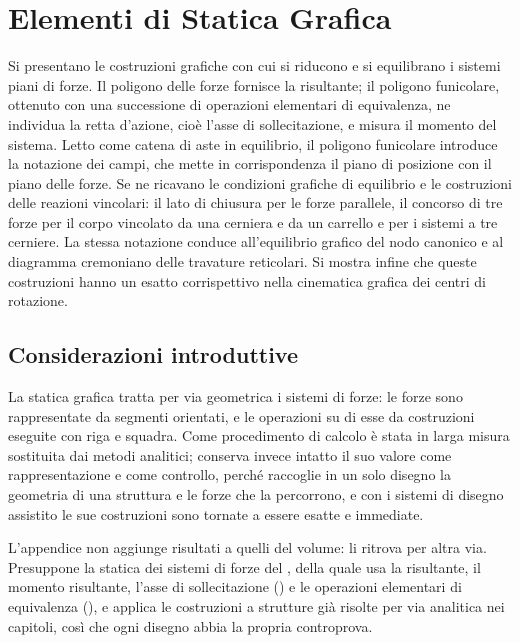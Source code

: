 \graphicspath{{Appendici/A01-statica_grafica/Figure/}}
\newcommand{\FiguraSGR}[1]{}

\chapter{Elementi di Statica Grafica}
\label{app:statica_grafica}

\begin{sommario}
	Si presentano le costruzioni grafiche con cui si riducono e si equilibrano i sistemi piani di
	forze. Il poligono delle forze fornisce la risultante; il poligono funicolare, ottenuto con una
	successione di operazioni elementari di equivalenza, ne individua la retta d'azione, cioè l'asse
	di sollecitazione, e misura il momento del sistema. Letto come catena di aste in equilibrio, il
	poligono funicolare introduce la notazione dei campi, che mette in corrispondenza il piano di
	posizione con il piano delle forze. Se ne ricavano le condizioni grafiche di equilibrio e le
	costruzioni delle reazioni vincolari: il lato di chiusura per le forze parallele, il concorso
	di tre forze per il corpo vincolato da una cerniera e da un carrello e per i sistemi a tre
	cerniere. La stessa notazione conduce all'equilibrio grafico del nodo canonico e al diagramma
	cremoniano delle travature reticolari. Si mostra infine che queste costruzioni hanno un esatto
	corrispettivo nella cinematica grafica dei centri di rotazione.
\end{sommario}

\section{Considerazioni introduttive}
\label{sec:intro_sgr}

La statica grafica tratta per via geometrica i sistemi di forze: le forze sono rappresentate da
segmenti orientati, e le operazioni su di esse da costruzioni eseguite con riga e squadra. Come
procedimento di calcolo è stata in larga misura sostituita dai metodi analitici; conserva invece
intatto il suo valore come rappresentazione e come controllo, perché raccoglie in un solo disegno
la geometria di una struttura e le forze che la percorrono, e con i sistemi di disegno assistito
le sue costruzioni sono tornate a essere esatte e immediate.

L'appendice non aggiunge risultati a quelli del volume: li ritrova per altra via. Presuppone la
statica dei sistemi di forze del , della quale usa la risultante, il
momento risultante, l'asse di sollecitazione () e le operazioni elementari
di equivalenza (), e applica le costruzioni a strutture già risolte per
via analitica nei capitoli, così che ogni disegno abbia la propria controprova.


